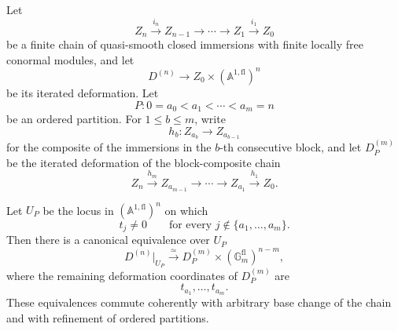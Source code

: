 \begin{proposition}
\label{prop:iterated-deformation-ordered-partitions}
Let
\[
    Z_n\xrightarrow{i_n}Z_{n-1}
    \longrightarrow\cdots\longrightarrow
    Z_1\xrightarrow{i_1}Z_0
\]
be a finite chain of quasi-smooth closed immersions with finite locally free
conormal modules, and let
\[
    D^{(n)}
    \longrightarrow
    Z_0\times(\mathbb A^{1,\mathrm{fl}})^n
\]
be its iterated deformation.  Let
\[
    P:
    0=a_0<a_1<\cdots<a_m=n
\]
be an ordered partition.  For \(1\leq b\leq m\), write
\[
    h_b:
    Z_{a_b}\longrightarrow Z_{a_{b-1}}
\]
for the composite of the immersions in the \(b\)-th consecutive block, and
let \(D_P^{(m)}\) be the iterated deformation of the block-composite chain
\[
    Z_n\xrightarrow{h_m}Z_{a_{m-1}}
    \longrightarrow\cdots\longrightarrow
    Z_{a_1}\xrightarrow{h_1}Z_0.
\]

Let \(U_P\) be the locus in
\((\mathbb A^{1,\mathrm{fl}})^n\) on which
\[
    t_j\neq0
    \qquad
    \text{for every }
    j\notin\{a_1,\ldots,a_m\}.
\]
Then there is a canonical equivalence over \(U_P\)
\[
    D^{(n)}|_{U_P}
    \xrightarrow{\simeq}
    D_P^{(m)}
    \times
    (\mathbb G_m^{\mathrm{fl}})^{n-m},
\]
where the remaining deformation coordinates of \(D_P^{(m)}\) are
\[
    t_{a_1},\ldots,t_{a_m}.
\]
These equivalences commute coherently with arbitrary base change of the
chain and with refinement of ordered partitions.

\end{proposition}

